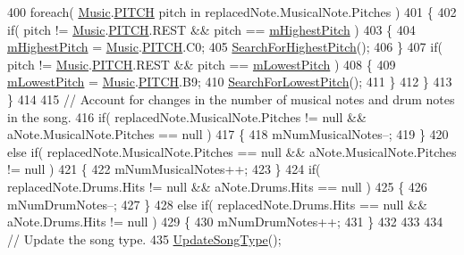 \begin{DoxyCodeInclude}
400             \textcolor{keywordflow}{foreach}( \hyperlink{class_music}{Music}.\hyperlink{group___music_enums_ga508f69b199ea518f935486c990edac1d}{PITCH} pitch in replacedNote.MusicalNote.Pitches )
401             \{
402                 \textcolor{keywordflow}{if}( pitch != \hyperlink{class_music}{Music}.\hyperlink{group___music_enums_ga508f69b199ea518f935486c990edac1d}{PITCH}.REST && pitch == 
      \hyperlink{group___song_priv_var_ga2dcd39d9add609e9df56a94057441dcc}{mHighestPitch} )
403                 \{
404                     \hyperlink{group___song_priv_var_ga2dcd39d9add609e9df56a94057441dcc}{mHighestPitch} = \hyperlink{class_music}{Music}.\hyperlink{group___music_enums_ga508f69b199ea518f935486c990edac1d}{PITCH}.C0;
405                     \hyperlink{group___song_priv_func_ga5f837e6b7f576732fa38747caa057621}{SearchForHighestPitch}();
406                 \}
407                 \textcolor{keywordflow}{if}( pitch != \hyperlink{class_music}{Music}.\hyperlink{group___music_enums_ga508f69b199ea518f935486c990edac1d}{PITCH}.REST && pitch == \hyperlink{group___song_priv_var_ga293976ef4c2050687a81edfbf77b4fc1}{mLowestPitch} )
408                 \{
409                     \hyperlink{group___song_priv_var_ga293976ef4c2050687a81edfbf77b4fc1}{mLowestPitch} = \hyperlink{class_music}{Music}.\hyperlink{group___music_enums_ga508f69b199ea518f935486c990edac1d}{PITCH}.B9;
410                     \hyperlink{group___song_priv_func_gac2e812c6385529eb7a9be5082c7bde75}{SearchForLowestPitch}();
411                 \}
412             \}
413         \}
414 
415         \textcolor{comment}{// Account for changes in the number of musical notes and drum notes in the song.}
416         \textcolor{keywordflow}{if}( replacedNote.MusicalNote.Pitches != null && aNote.MusicalNote.Pitches == null )
417         \{
418             mNumMusicalNotes--;
419         \}
420         \textcolor{keywordflow}{else} \textcolor{keywordflow}{if}( replacedNote.MusicalNote.Pitches == null && aNote.MusicalNote.Pitches != null )
421         \{
422             mNumMusicalNotes++;
423         \}
424         \textcolor{keywordflow}{if}( replacedNote.Drums.Hits != null && aNote.Drums.Hits == null )
425         \{
426             mNumDrumNotes--;
427         \}
428         \textcolor{keywordflow}{else} \textcolor{keywordflow}{if}( replacedNote.Drums.Hits == null && aNote.Drums.Hits != null )
429         \{
430             mNumDrumNotes++;
431         \}
432 
433 
434         \textcolor{comment}{// Update the song type.}
435         \hyperlink{group___song_priv_func_ga9a1d6eba1576c3631d3c0331196d9ae2}{UpdateSongType}();

\end{DoxyCodeInclude}
